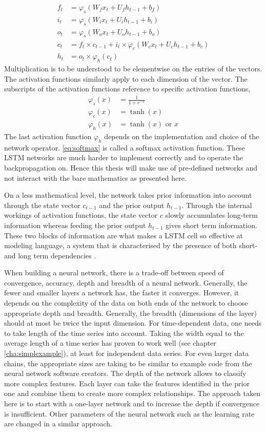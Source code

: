 \documentclass[10pt, a4paper]{UUThesisTemplate}
\begin{document}
\begin{align}
f_t &= \varphi_s(W_f x_t + U_f h_{t-1} + b_f)\\
i_t &= \varphi_s(W_i x_t + U_i h_{t-1} + b_i)\\
o_t &= \varphi_s(W_o x_t + U_o h_{t-1} + b_o)\\
c_t &= f_t \times c_{t-1} + i_t \times \varphi_c(W_cx_t + U_c h_{t-1} + b_c)\\
h_t &= o_t \times \varphi_h(c_t)
\end{align}
Multiplication is to be understood to be elementwise on the entries of the vectors. The activation functions similarly apply to each dimension of the vector. The subscripts of the activation functions reference to specific activation functions, 
\begin{align}
\varphi_s(x) &= \frac1{1+e^{-x}}\label{eq:softmax}\\
\varphi_c(x) &= \tanh(x)\\
\varphi_h(x) &= \tanh(x) \text{ or } x
\end{align}
The last activation function $\varphi_h$ depends on the implementation and choice of the network operator. \eqref{eq:softmax} is called a softmax activation function. These LSTM networks are much harder to implement correctly and to operate the backpropagation on. Hence this thesis will make use of pre-defined networks and not interact with the bare mathematics as presented here.

On a less mathematical level, the network takes prior information into account through the state vector $c_{t-1}$ and the prior output $h_{t-1}$. Through the internal workings of activation functions, the state vector $c$ slowly accumulates long-term information whereas feeding the prior output $h_{t-1}$ gives short term information. These two blocks of information are what makes a LSTM cell so effective at modeling language, a system that is characterised by the presence of both short- and long term dependencies \cite{LSTM}.  

When building a neural network, there is a trade-off between speed of convergence, accuracy, depth and breadth of a neural network. Generally, the fewer and smaller layers a network has, the faster it converges. However, it depends on the complexity of the data on both ends of the network to choose appropriate depth and breadth. Generally, the breadth (dimensions of the layer) should at most be twice the input dimension. For time-dependent data, one needs to take length of the time series into account. Taking the width equal to the average length of a time series has proven to work well (see chapter \ref{cha:simplexample}), at least for independent data series. For even larger data chains, the appropriate sizes are taking to be similar to example code from the neural network software creators. The depth of the network allows to classify more complex features. Each layer can take the features identified in the prior one and combine them to create more complex relationships. The approach taken here is to start with a one-layer network and to increase the depth if convergence is insufficient. Other parameters of the neural network such as the learning rate are changed in a similar approach.
\end{document}
